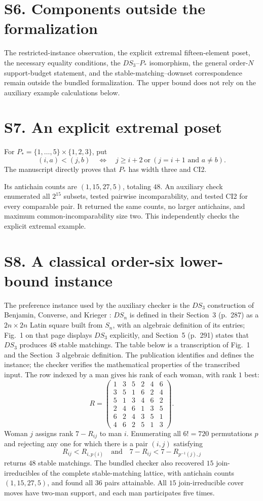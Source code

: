\documentclass[11pt]{article}
\begin{document}
\section*{S6. Components outside the formalization}
The restricted-instance observation, the explicit extremal fifteen-element
poset, the necessary equality conditions, the $DS_3$--$P_*$ isomorphism,
the general order-$N$ support-budget statement, and the
stable-matching--downset correspondence remain outside the bundled
formalization.  The upper bound does not rely on the auxiliary
example calculations below.

\section*{S7. An explicit extremal poset}
For $P_* = \{1,\ldots,5\}\times\{1,2,3\}$, put
\[
(i,a)<(j,b)\quad\Longleftrightarrow\quad
j\ge i+2\ \text{or}\ (j=i+1\text{ and }a\ne b).
\]
The manuscript directly proves that $P_*$ has width three and CI2.

Its antichain counts are $(1,15,27,5)$, totaling $48$.  An auxiliary check
enumerated all $2^{15}$ subsets, tested pairwise incomparability, and tested
CI2 for every comparable pair.  It returned the same counts, no larger
antichains, and maximum common-incomparability size two.  This independently
checks the explicit extremal example.

\section*{S8. A classical order-six lower-bound instance}
The preference instance used by the auxiliary checker is the $DS_3$
construction of Benjamin, Converse, and Krieger \cite{BenjaminCK1995}:
$DS_n$ is defined in their Section~3 (p.~287) as a $2n\times2n$ Latin
square built from $S_n$, with an algebraic definition of its entries;
Fig.~1 on that page displays $DS_3$ explicitly, and Section~5 (p.~291)
states that $DS_3$ produces $48$ stable matchings.
The table below is a transcription of Fig.~1 and the Section~3 algebraic
definition.  The publication identifies and defines the instance; the
checker verifies the mathematical properties of the transcribed input.
The row indexed by a man gives his rank of each woman, with rank $1$ best:
\[
R=\begin{pmatrix}
1&3&5&2&4&6\\
3&5&1&6&2&4\\
5&1&3&4&6&2\\
2&4&6&1&3&5\\
6&2&4&3&5&1\\
4&6&2&5&1&3
\end{pmatrix}.
\]
Woman $j$ assigns rank $7-R_{ij}$ to man $i$.  Enumerating all $6!=720$
permutations $p$ and rejecting any one for which there is a pair $(i,j)$
satisfying
\[
R_{ij}<R_{i,p(i)}
\quad\text{and}\quad
7-R_{ij}<7-R_{p^{-1}(j),j}
\]
returns $48$ stable matchings.  The bundled checker also
recovered $15$ join-irreducibles of the complete stable-matching lattice,
with antichain counts $(1,15,27,5)$, and found all $36$ pairs attainable.
All $15$ join-irreducible cover moves have two-man support, and each man
participates five times.
\end{document}
